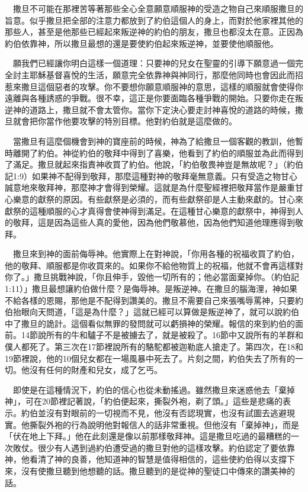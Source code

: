 \documentclass{book}
\begin{document}
　撒旦不可能在那裡苦等著那些全心全意願意順服神的受造之物自己來順服撒旦的旨意。似乎撒旦把全部的注意力都放到了約伯這個人的身上，而對於他家裡其他的那些人，甚至是他那些已經起來叛逆神的約伯的朋友，撒旦也都沒太在意。正因為約伯依靠神，所以撒旦最想的還是要使約伯起來叛逆神，並要使他順服他。

　願我們已經讓你明白這樣一個道理：只要神的兒女在聖靈的引導下願意過一個完全討主耶穌基督喜悅的生活，願意完全依靠神與神同行，那麼他同時也會因此而招惹來撒旦這個惡者的攻擊。你不要想你願意順服神的意思，這樣的順服就會使得你遠離與各種誘惑的爭戰。很不幸，這正是你要面臨各種爭戰的開始。只要你走在叛逆神的道路上，撒旦就不會太管你。當你下定決心要走討神喜悅的道路的時候，撒旦就會把你當作他要攻擊的特別目標。他對約伯就是這麼做的。

　當撒旦有這麼個機會到神的寶座前的時候，神為了給撒旦一個客觀的教訓，他暫時離開了約伯。神從約伯的敬拜中得到了喜樂，他看到了約伯的順服並為此而得到了滿足。撒旦就起來指責神收買了約伯。他說，「約伯敬畏神豈是無故呢？」（約伯記1:9）如果神不配得到敬拜，那麼這種對神的敬拜毫無意義。只有受造之物甘心誠意地來敬拜神，那麼神才會得到榮耀。這就是為什麼聖經裡把敬拜當作是嚴重甘心樂意的獻祭的原因。有些獻祭是必須的，而有些獻祭卻是人主動來獻的。甘心來獻祭的這種順服的心才真得會使神得到滿足。在這種甘心樂意的獻祭中，神得到人的敬拜，這是因為這些人真的愛他，因為他們敬慕他，因為他們知道他理應得到敬拜。

　撒旦來到神的面前侮辱神。他實際上在對神說，「你用各種的祝福收買了約伯，他的敬拜、順服都是你收買來的。如果你不給他物質上的祝福，他就不會再這樣對你了。」撒旦挑戰神說，「你且伸手，毀他一切所有的；他必當面棄掉你。（約伯記1:11）」撒旦最想讓約伯做什麼？是侮辱神。是叛逆神。在撒旦的腦海浬，神如果不給各樣的恩賜，那他是不配得到讚美的。撒旦不需要自己來張嘴辱罵神，只要約伯抬眼向天問道，「這是為什麼？」這就已經可以算做是叛逆神了，就可以說約伯中了撒旦的詭計。這個看似無罪的發問就可以虧損神的榮耀。報信的來到約伯的面前。14節說所有的牛和驢子不是被擄去了，就是被殺了。16節中又說所有的羊群和僕人都死了。第三次在17節裡說所有的駱駝都被迦勒底人搶走了。第四次，在18和19節裡說，他的10個兒女都在一場風暴中死去了。片刻之間，約伯失去了所有的一切。他沒有任何的財產和兒女，成了乞丐。

　即使是在這種情況下，約伯的信心也從未動搖過。雖然撒旦來迷惑他去「棄掉神」，可在20節裡記著說，「約伯便起來，撕裂外袍，剃了頭。」這些是悲痛的表示。約伯並沒有對眼前的一切視而不見，他沒有否認現實，也沒有試圖去逃避現實。他撕裂外袍的行為說明他對報信人的話非常重視。但他沒有「棄掉神」，而是「伏在地上下拜。」他在此刻還是像以前那樣敬拜神。這是撒旦吃過的最糟糕的一次敗仗。很少有人遇到過約伯遭受過的撒旦對他的這樣攻擊。約伯認定了要依靠神，他看清了神的良善，他知道神的智慧是值得相信的，這些使約伯得以支撐下來，沒有使撒旦聽到他想聽的話。撒旦聽到的是從神的聖徒口中傳來的讚美神的話。
\end{document}

